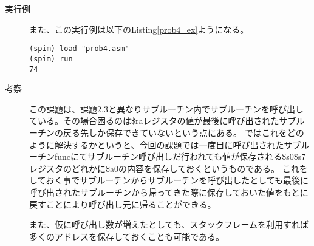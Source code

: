 \documentclass{jsarticle}
\begin{document}
\begin{description}
\begin{description}
            \item[実行例]
            また、この実行例は以下のListing\ref{prob4_ex}ようになる。
            \begin{lstlisting}[caption=課題4の実行例, label=prob4_ex]
(spim) load "prob4.asm"
(spim) run
74
            \end{lstlisting}

            \item[考察]
            この課題は、課題2,3と異なりサブルーチン内でサブルーチンを呼び出している。その場合困るのは\$raレジスタの値が最後に呼び出されたサブルーチンの戻る先しか保存できていないという点にある。
            ではこれをどのように解決するかというと、今回の課題では一度目に呼び出されたサブルーチンfuncにてサブルーチン呼び出しだ行われても値が保存される\$s0\~\$s7レジスタのどれかに\$a0の内容を保存しておくというものである。
            これをしておく事でサブルーチンからサブルーチンを呼び出したとしても最後に呼び出されたサブルーチンから帰ってきた際に保存しておいた値をもとに戻すことにより呼び出し元に帰ることができる。

            また、仮に呼び出し数が増えたとしても、スタックフレームを利用すれば多くのアドレスを保存しておくことも可能である。
        \end{description}
    \end{description}
\end{document}

